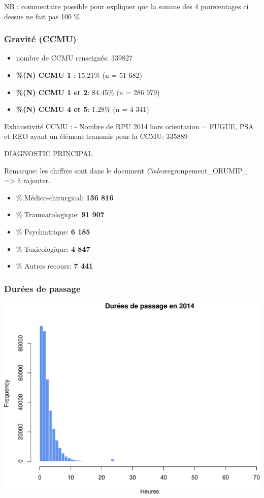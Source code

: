 \documentclass[]{article}
\begin{document}
NB : commentaire possible pour expliquer que la somme des 4 pourcentages
ci dessus ne fait pas 100 \%

\subsubsection{Gravité (CCMU)}\label{gravite-ccmu}

\begin{itemize}
\itemsep1pt\parskip0pt
\item
  nombre de CCMU renseignés: 339827
\item
  \textbf{\%(N) CCMU 1 }: 15.21\% (n = 51 682)
\item
  \textbf{\%(N) CCMU 1 et 2}: 84.45\% (n = 286 979)
\item
  \textbf{\%(N) CCMU 4 et 5}: 1.28\% (n = 4 341)
\end{itemize}

Exhaustivité CCMU : - Nombre de RPU 2014 hors orientation = FUGUE, PSA
et REO ayant un élément transmis pour la CCMU: 335889

DIAGNOSTIC PRINCIPAL

Remarque: les chiffres sont dans le document
\emph{Codes}regroupement\_ORUMIP\_ =\textgreater{} à rajouter.

\begin{itemize}
\itemsep1pt\parskip0pt
\item
  \% Médico-chirurgical: \textbf{136 816}
\item
  \% Traumatologique: \textbf{91 907}
\item
  \% Psychiatrique: \textbf{6 185}
\item
  \% Toxicologique: \textbf{4 847}
\item
  \% Autres recours: \textbf{7 441}
\end{itemize}

\subsubsection{Durées de passage}\label{durees-de-passage}

\includegraphics{rapport2014_V4_files/figure-latex/passages-1.pdf}
\end{document}
